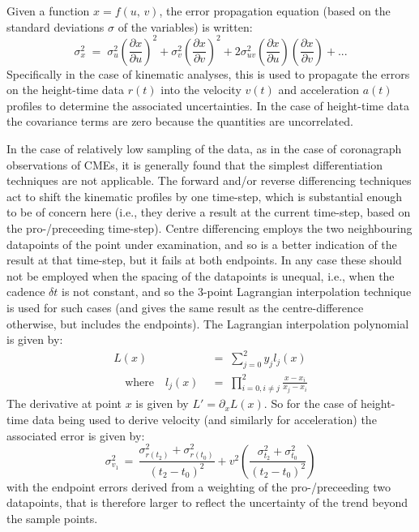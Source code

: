\documentclass[structabstract]{aa}
\begin{document}
Given a function $x=f(u,\,v)$, the error propagation equation (based on the standard deviations $\sigma$ of the variables) is written:
\begin{equation}
\label{eqn_errorprop}
\sigma_x^2 \; = \; \sigma_u^2 \left(\frac{\partial x}{\partial u}\right) ^2 + \sigma_v^2 \left( \frac{\partial x}{\partial v} \right) ^2 + 2 \sigma_{uv}^2 \left( \frac{\partial x}{\partial u} \right) \left( \frac{\partial x}{\partial v} \right) + ...
\end{equation}
Specifically in the case of kinematic analyses, this is used to propagate the errors on the height-time data $r(t)$ into the velocity $v(t)$ and acceleration $a(t)$ profiles to determine the associated uncertainties. In the case of height-time data the covariance terms are zero because the quantities are uncorrelated.

In the case of relatively low sampling of the data, as in the case of coronagraph observations of CMEs, it is generally found that the simplest differentiation techniques are not applicable. The forward and/or reverse differencing techniques act to shift the kinematic profiles by one time-step, which is substantial enough to be of concern here (i.e., they derive a result at the current time-step, based on the pro-/preceeding time-step). Centre differencing employs the two neighbouring datapoints of the point under examination, and so is a better indication of the result at that time-step, but it fails at both endpoints. In any case these should not be employed when the spacing of the datapoints is unequal, i.e., when the cadence $\delta t$ is not constant, and so the 3-point Lagrangian interpolation technique is used for such cases (and gives the same result as the centre-difference otherwise, but includes the endpoints). The Lagrangian interpolation polynomial is given by:
\begin{eqnarray}
L(x) \; &=\; \sum_{j=0}^2 y_j l_j(x) \\ \quad \mbox{where} \quad
l_j(x) \; &=\; \prod_{i=0, i\neq j}^2 \frac{x-x_i}{x_j-x_i} 
\end{eqnarray}
The derivative at point $x$ is given by $L'=\partial_x L(x)$. So for the case of height-time data being used to derive velocity (and similarly for acceleration) the associated error is given by:
\begin{equation}
\sigma_{v_1}^2 \,=\, \frac{\sigma_{r(t_2)}^2+\sigma_{r(t_0)}^2}{(t_2-t_0)^2} + v^2 \left( \frac{\sigma_{t_2}^2+\sigma_{t_0}^2}{(t_2-t_0)^2} \right)
\label{vel_err}
\end{equation}
with the endpoint errors derived from a weighting of the pro-/preceeding two datapoints, that is therefore larger to reflect the uncertainty of the trend beyond the sample points.
\end{document}
